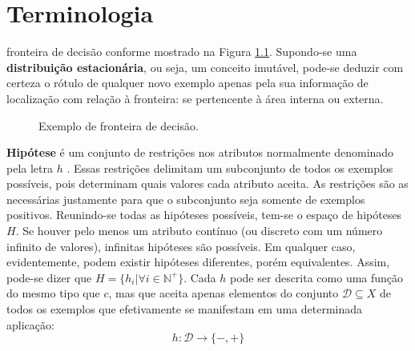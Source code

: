 \chapter{Terminologia}\label{terminologia}


fronteira de decisão conforme mostrado na Figura \ref{fig:fronteiras}.
Supondo-se uma \textbf{distribuição estacionária}, ou seja, um conceito imutável,
pode-se deduzir com certeza o rótulo de qualquer novo exemplo apenas pela sua
informação de localização com relação à fronteira: se pertencente à área interna ou externa.

\pgfplotsset{width=12cm,compat=1.5.1}
\begin{figure}
\begin{center}
\caption{Exemplo de fronteira de decisão.}
\label{fig:fronteiras}
\end{center}
\end{figure}


\textbf{Hipótese} é um conjunto de restrições nos atributos normalmente denominado pela
letra $h$ \citep{mitchell1997machine}.
Essas restrições delimitam um subconjunto de todos os exemplos possíveis,
pois determinam quais valores cada atributo aceita.
As restrições são as necessárias justamente para que o subconjunto seja somente de exemplos
positivos.
Reunindo-se todas as hipóteses possíveis, tem-se o espaço de hipóteses $H$.
Se houver pelo menos um atributo contínuo (ou discreto com um número infinito de valores),
infinitas hipóteses são possíveis.
Em qualquer caso, evidentemente, podem existir hipóteses diferentes, porém equivalentes.
Assim, pode-se dizer que $H = \{h_i | \forall i \in \mathbb{N}^+\}$.
Cada $h$ pode ser descrita como uma função do mesmo tipo que $c$, mas que aceita apenas
elementos do conjunto $\mathcal{D} \subseteq X$ de todos os exemplos que efetivamente se
manifestam em uma determinada aplicação:
\begin{equation}
h: \mathcal{D} \rightarrow \{-,+\}
\end{equation}


